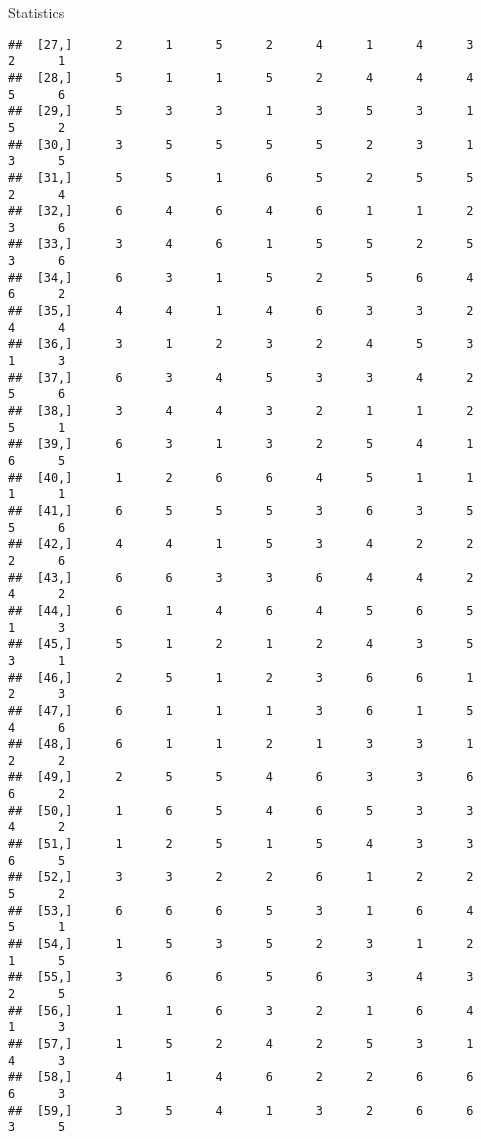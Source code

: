 \documentclass[
  ignorenonframetext,
]{beamer}
\begin{document}
\begin{frame}[fragile]{Statistics}
\begin{verbatim}
##  [27,]      2      1      5      2      4      1      4      3      2      1
##  [28,]      5      1      1      5      2      4      4      4      5      6
##  [29,]      5      3      3      1      3      5      3      1      5      2
##  [30,]      3      5      5      5      5      2      3      1      3      5
##  [31,]      5      5      1      6      5      2      5      5      2      4
##  [32,]      6      4      6      4      6      1      1      2      3      6
##  [33,]      3      4      6      1      5      5      2      5      3      6
##  [34,]      6      3      1      5      2      5      6      4      6      2
##  [35,]      4      4      1      4      6      3      3      2      4      4
##  [36,]      3      1      2      3      2      4      5      3      1      3
##  [37,]      6      3      4      5      3      3      4      2      5      6
##  [38,]      3      4      4      3      2      1      1      2      5      1
##  [39,]      6      3      1      3      2      5      4      1      6      5
##  [40,]      1      2      6      6      4      5      1      1      1      1
##  [41,]      6      5      5      5      3      6      3      5      5      6
##  [42,]      4      4      1      5      3      4      2      2      2      6
##  [43,]      6      6      3      3      6      4      4      2      4      2
##  [44,]      6      1      4      6      4      5      6      5      1      3
##  [45,]      5      1      2      1      2      4      3      5      3      1
##  [46,]      2      5      1      2      3      6      6      1      2      3
##  [47,]      6      1      1      1      3      6      1      5      4      6
##  [48,]      6      1      1      2      1      3      3      1      2      2
##  [49,]      2      5      5      4      6      3      3      6      6      2
##  [50,]      1      6      5      4      6      5      3      3      4      2
##  [51,]      1      2      5      1      5      4      3      3      6      5
##  [52,]      3      3      2      2      6      1      2      2      5      2
##  [53,]      6      6      6      5      3      1      6      4      5      1
##  [54,]      1      5      3      5      2      3      1      2      1      5
##  [55,]      3      6      6      5      6      3      4      3      2      5
##  [56,]      1      1      6      3      2      1      6      4      1      3
##  [57,]      1      5      2      4      2      5      3      1      4      3
##  [58,]      4      1      4      6      2      2      6      6      6      3
##  [59,]      3      5      4      1      3      2      6      6      3      5

\end{verbatim}
\end{frame}
\end{document}

